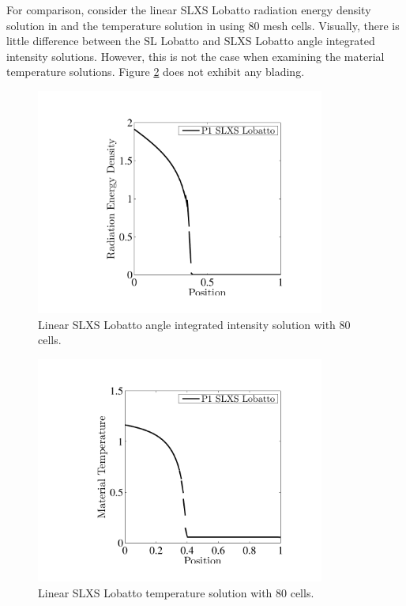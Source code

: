 For comparison, consider the linear SLXS Lobatto radiation energy density solution in  and the temperature solution in  using 80 mesh cells.
Visually, there is little difference between the SL Lobatto and SLXS Lobatto angle integrated intensity solutions.
However, this is not the case when examining the material temperature solutions.  Figure \ref{fig:linear_slxs_full_temp} does not exhibit any blading.

%
\begin{figure}[!hbp]
\centering
\includegraphics[width=9.5cm,trim=1.2in  0.2in 0.75in 0.5in,clip=true]{chapter6_grey_radtran/Dissertation_Data/SLXS_Lobatto_80_Cells_Radiation.pdf}
\caption{Linear SLXS Lobatto angle integrated intensity solution with 80 cells.}
\label{fig:linear_slxs_full_rad}
\end{figure}
%
%
\begin{figure}[!htp]
\centering
\includegraphics[width=9.5cm,trim=1.2in  0.2in 0.75in 0.5in,clip=true]{chapter6_grey_radtran/Dissertation_Data/SLXS_Lobatto_80_Cells_Temperature.pdf}
\caption{Linear SLXS Lobatto temperature solution with 80 cells.}
\label{fig:linear_slxs_full_temp}
\end{figure}
%

